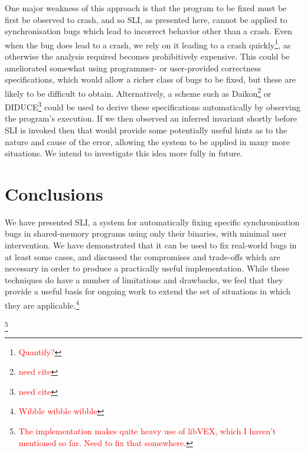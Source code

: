 \documentclass[10pt,twocolumn,preprint,natbib,authoryear]{sigplanconf}
\newcommand{\editorial}[1]{\textcolor{red}{\footnote{\textcolor{red}{#1}}}}
\newcommand{\needCite}{\editorial{need cite}}
\begin{document}
One major weakness of this approach is that the program to be fixed
must be first be observed to crash, and so SLI, as presented here,
cannot be applied to synchronisation bugs which lead to incorrect
behavior other than a crash.  Even when the bug does lead to a crash,
we rely on it leading to a crash quickly\editorial{Quantify?}, as
otherwise the analysis required becomes prohibitively expensive.  This
could be ameliorated somewhat using programmer- or user-provided
correctness specifications, which would allow a richer class of bugs
to be fixed, but these are likely to be difficult to obtain.
Alternatively, a scheme such as Daikon\needCite{} or DIDUCE\needCite{}
could be used to derive these specifications automatically by
observing the program's execution.  If we then observed an inferred
invariant shortly before SLI is invoked then that would provide some
potentially useful hints as to the nature and cause of the error,
allowing the system to be applied in many more situations.  We intend
to investigate this idea more fully in future.

\section{Conclusions}

We have presented SLI, a system for automatically fixing specific
synchronisation bugs in shared-memory programs using only their
binaries, with minimal user intervention.  We have demonstrated that
it can be used to fix real-world bugs in at least some cases, and
discussed the compromises and trade-offs which are necessary in order
to produce a practically useful implementation.  While these
techniques do have a number of limitations and drawbacks, we feel that
they provide a useful basis for ongoing work to extend the set of
situations in which they are applicable.\editorial{Wibble wibble
  wibble}

\acks

\editorial{The implementation makes quite heavy use of libVEX, which I
  haven't mentioned so far.  Need to fix that somewhere.}




\end{document}
